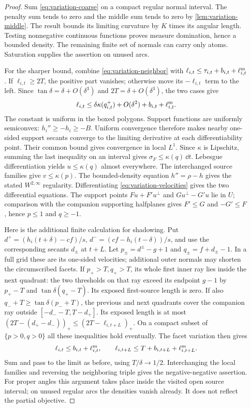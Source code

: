 \begin{proof}
Sum \eqref{eq:variation-coarse} on a compact regular normal interval.
The penalty sum tends to zero and the middle sum tends to zero by
\cref{lem:variation-middle}. The result bounds its limiting curvature
by $K$ times its angular length. Testing nonnegative continuous
functions proves measure domination, hence a bounded density.
The remaining finite set of normals can carry only atoms.
Saturation supplies the assertion on unused arcs.

For the sharper bound, combine
\eqref{eq:variation-neighbor} with
$\ell_{i,t}\le\tau_{i,t}+b_{i,t}+\ell^{\rm m}_{i,t}$.
If $\ell_{i,t}\ge2T$, the positive part vanishes; otherwise move
its $-\ell_{i,t}$ term to the left. Since $\tan\delta=\delta+O(\delta^3)$
and $2T=\delta+O(\delta^3)$, the two cases give
\[
 \ell_{i,t}\le\delta\kappa(q^+_{i,t})+O(\delta^2)
                 +b_{i,t}+\ell^{\rm m}_{i,t}.
\]
The constant is uniform in the boxed polygons. Support functions
are uniformly semiconvex: $h_i''\ge-h_i\ge-B$.
Uniform convergence therefore makes nearby one-sided support
secants converge to the limiting derivative at each differentiability
point. Their common bound gives convergence in local $L^1$.
Since $\kappa$ is Lipschitz, summing the last inequality on an
interval gives $\sigma_F\le\kappa(q)\,\dd t$. Lebesgue
differentiation yields $u\le\kappa(q)$ almost everywhere.
The interchanged source families give $v\le\kappa(p)$.
The bounded-density equation $h''=\rho-h$ gives the stated
$W^{2,\infty}$ regularity. Differentiating
\eqref{eq:variation-velocities} gives the two differential equations.
The support points $Fu+F'u^\perp$ and
$Gu^\perp-G'u$ lie in $U$; comparison with the companion
supporting halfplanes gives $F'\le G$ and $-G'\le F$,
hence $p\le1$ and $q\ge-1$.

Here is the additional finite calculation for shadowing. Put
$d^+=(h_i(t+\delta)-cf)/s$, $d^-=(cf-h_i(t-\delta))/s$,
and use the corresponding secants $d_\pm$ at $t+L$.
Let $p_\pm=d^\pm-g+1$ and $q_\pm=f+d_\pm-1$.
In a full grid these are its one-sided velocities; additional
outer normals may shorten the circumscribed facets.
If $p_+>T,q_+>T$, its whole
first inner ray lies inside the next quadrant: the two thresholds
on that ray exceed its endpoint $g-1$ by
$p_+-T$ and $\tan\delta(q_+-T)$.
Its exposed first-source length is zero. If also
$q_-+T\ge\tan\delta(p_-+T)$, the previous and next quadrants
cover the companion ray outside
$[-d_--T,T-d_+]$. Its exposed length is at most
$(2T-(d_+-d_-))_+\le(2T-\ell_{i,t+L})_+$.
On a compact subset of $\{p>0,q>0\}$ all these inequalities hold
eventually. The facet variation then gives
\[
 \ell_{i,t}\le b_{i,t}+\ell^{\rm m}_{i,t},\qquad
 \ell_{i,t+L}\le T+b_{i,t+L}+\ell^{\rm m}_{i,t+L}.
\]
Sum and pass to the limit as before, using $T/\delta\to1/2$.
Interchanging the local families and reversing the neighboring
triple gives the negative-negative assertion. For proper angles
this argument takes place inside the visited open source interval;
on unused regular arcs the densities vanish already. It does not
reflect the partial objective.


\end{proof}
